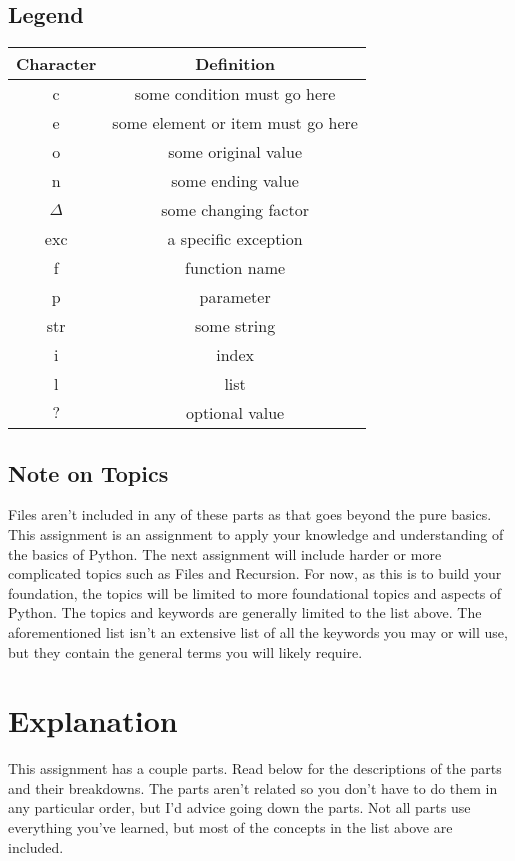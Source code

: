 \documentclass[12pt]{report}
\begin{document}
\subsection*{Legend}

\begin{tabular}{| c | c |}
    \hline
    Character & Definition \\
    \hline
    c & some condition must go here \\
    \hline
    e & some element or item must go here \\
    \hline
    o & some original value \\
    \hline
    n & some ending value \\
    \hline
    ${\Delta}$ & some changing factor \\ 
    \hline
    exc & a specific exception \\
    \hline
    f & function name \\
    \hline
    p & parameter \\
    \hline
    str & some string \\
    \hline
    i & index \\
    \hline
    l & list \\
    \hline
    ${?}$ & optional value \\
    \hline
\end{tabular}

\subsection*{Note on Topics}
Files aren't included in any of these parts as that goes beyond the pure basics. 
This assignment is an assignment to apply your knowledge and understanding of the basics of Python. 
The next assignment will include harder or more complicated topics such as Files and Recursion.
For now, as this is to build your foundation, the topics will be limited to more foundational topics and aspects of Python.
The topics and keywords are generally limited to the list above. 
The aforementioned list isn't an extensive list of all the keywords you may or will use, but they contain the general terms you will likely require.

\newpage

\section*{Explanation}

\hspace*{0.5cm} This assignment has a couple parts. 
Read below for the descriptions of the parts and their breakdowns. 
The parts aren't related so you don't have to do them in any particular order, but I'd advice going down the parts. 
Not all parts use everything you've learned, but most of the concepts in the list above are included.
\end{document}
